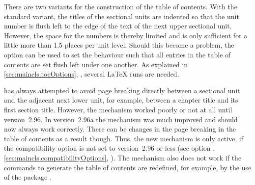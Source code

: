 There are two variants for the construction of the table of
contents. With the standard variant, the titles of the sectional units
are indented so that the unit number is flush left to the edge of the
text of the next upper sectional unit.  However, the space for the
numbers is thereby limited and is only sufficient for a little more
than 1.5 places per unit level.  Should this become a problem, the
option  can be used to set the behaviour such that all
entries in the table of contents are set flush left under one
another. As explained in \autoref{sec:maincls.tocOptions},
, several {\LaTeX} runs are
needed.

{\KOMAScript} has always attempted to avoid page breaking directly
between a sectional unit and the adjacent next lower unit, for
example, between a chapter title and its first section title. However,
the mechanism worked poorly or not at all until version~2.96. In
version~2.96a the
mechanism was much improved and should now always work
correctly. There can be changes in the page breaking in the table of
contents as a result though. Thus, the new mechanism is only active,
if the compatibility option is not set to version~2.96 or less (see
option , \autoref{sec:maincls.compatibilityOptions},
). The mechanism also does
not work if the commands to generate the table of contents are
redefined, for example, by the use of the package .

